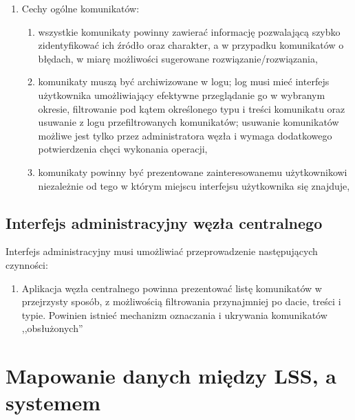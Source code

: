 \documentclass[a4paper]{report}
\begin{document}
\begin{enumerate}
\begin{enumerate}
  \item Cechy ogólne komunikatów:
  \begin{enumerate}
    \item wszystkie komunikaty powinny zawierać informację pozwalającą szybko zidentyfikować ich źródło oraz charakter, a w przypadku komunikatów o błędach, w miarę możliwości sugerowane rozwiązanie/rozwiązania,
    \item komunikaty muszą być archiwizowane w logu; log musi mieć interfejs użytkownika umożliwiający efektywne przeglądanie go w wybranym okresie, filtrowanie pod kątem określonego typu i treści komunikatu oraz usuwanie z logu przefiltrowanych komunikatów; usuwanie komunikatów możliwe jest tylko przez administratora węzła i wymaga dodatkowego potwierdzenia chęci wykonania operacji,
    \item komunikaty powinny być prezentowane zainteresowanemu użytkownikowi niezależnie od tego w którym miejscu interfejsu użytkownika się znajduje,
  \end{enumerate}
\end{enumerate}

\subsection{Interfejs administracyjny węzła centralnego}

Interfejs administracyjny musi umożliwiać przeprowadzenie następujących czynności:
\begin{enumerate}
  \item Aplikacja węzła centralnego powinna prezentować listę komunikatów w przejrzysty sposób, z możliwością filtrowania przynajmniej po dacie, treści i typie. Powinien istnieć mechanizm oznaczania i ukrywania komunikatów ,,obsłużonych''
\end{enumerate}

\end{enumerate}

\section{Mapowanie danych między LSS, a systemem}
\end{document}
